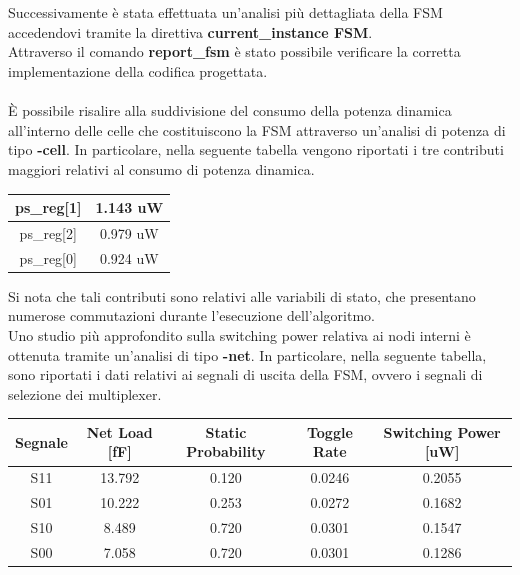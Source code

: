 \documentclass[11pt,  english, makeidx, a4paper, titlepage, oneside]{book}
\begin{document}
\\\\
Successivamente è stata effettuata un'analisi più dettagliata della FSM accedendovi tramite la direttiva\textbf{ current\_instance FSM}.\\
Attraverso il comando \textbf{report\_fsm} è stato possibile verificare la corretta implementazione della codifica progettata.
\\\\
È possibile risalire alla suddivisione del consumo della potenza dinamica all'interno delle celle che costituiscono la FSM attraverso un'analisi di potenza di tipo \textbf{-cell}. In particolare, nella seguente tabella vengono riportati i tre contributi maggiori relativi al consumo di potenza dinamica.
\\
\begin{center}
	\begin{tabular}{|c|c|}
	\hline
	  ps\_reg[1] & 1.143 uW  \\
	\hline
	 ps\_reg[2] & 0.979 uW\\
	\hline
	ps\_reg[0] & 0.924 uW\\
	\hline
	\end{tabular}	
\end{center}
\vspace{0.3cm}
Si nota che tali contributi sono relativi alle variabili di stato, che presentano numerose commutazioni durante l'esecuzione dell'algoritmo.
\\
Uno studio più approfondito sulla switching power relativa ai nodi interni è ottenuta tramite un'analisi di tipo \textbf{-net}. In particolare, nella seguente tabella, sono riportati i dati relativi ai segnali di uscita della FSM, ovvero i segnali di selezione dei multiplexer.
\\
\begin{center}
	\begin{tabular}{|c|c|c|c|c|}
	\hline
	Segnale & Net Load [fF] & Static Probability & Toggle Rate & Switching Power [uW] \\
	\hline
	 S11 & 13.792  &  0.120  &  0.0246  & 0.2055 \\
	\hline
	 S01 & 10.222  &  0.253  &  0.0272  & 0.1682 \\
	\hline
	S10 & 8.489  &  0.720  &  0.0301  & 0.1547\\
	\hline
	S00 & 7.058  &  0.720  &  0.0301  & 0.1286 \\
	\hline
	\end{tabular}	
\end{center}
\end{document}

